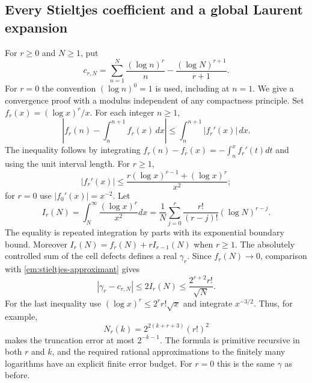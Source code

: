 \subsection{Every Stieltjes coefficient and a global Laurent expansion}

For $r\geq0$ and $N\geq1$, put
\begin{equation}
 c_{r,N}=\sum_{n=1}^N\frac{(\log n)^r}{n}
           -\frac{(\log N)^{r+1}}{r+1}.
 \label{em:stieltjes-approximant}
\end{equation}
For $r=0$ the convention $(\log n)^0=1$ is used, including at $n=1$.
We give a convergence proof with a modulus independent of any compactness
principle.  Set $f_r(x)=(\log x)^r/x$.  For each integer $n\geq1$,
\[
 \left|f_r(n)-\int_n^{n+1}f_r(x)\,dx\right|
       \leq\int_n^{n+1}|f_r'(x)|\,dx.
\]
The inequality follows by integrating
$f_r(n)-f_r(x)=-\int_n^x f_r'(t)dt$ and using the unit interval length.
For $r\geq1$,
\[
 |f_r'(x)|\leq
 \frac{r(\log x)^{r-1}+(\log x)^r}{x^2};
\]
for $r=0$ use $|f_0'(x)|=x^{-2}$.
Let
\[
 I_r(N)=\int_N^\infty\frac{(\log x)^r}{x^2}dx
       =\frac1N\sum_{j=0}^r\frac{r!}{(r-j)!}(\log N)^{r-j}.
\]
The equality is repeated integration by parts with its exponential
boundary bound.  Moreover
$I_r(N)=f_r(N)+rI_{r-1}(N)$ when $r\geq1$.
The absolutely controlled sum of the cell defects defines a real
$\gamma_r$.  Since $f_r(N)\to0$, comparison with
\eqref{em:stieltjes-approximant} gives
\begin{equation}
 |\gamma_r-c_{r,N}|\leq2I_r(N)
 \leq\frac{2^{r+2}r!}{\sqrt N}.
 \label{em:stieltjes-tail}
\end{equation}
For the last inequality use
$(\log x)^r\leq2^r r!\sqrt x$ and integrate $x^{-3/2}$.
Thus, for example,
\begin{equation}
 N_r(k)=2^{2(k+r+3)}(r!)^2
 \label{em:stieltjes-modulus}
\end{equation}
makes the truncation error at most $2^{-k-1}$.  The formula is primitive
recursive in both $r$ and $k$, and the required rational approximations
to the finitely many logarithms have an explicit finite error budget.
For $r=0$ this is the same $\gamma$ as before.

